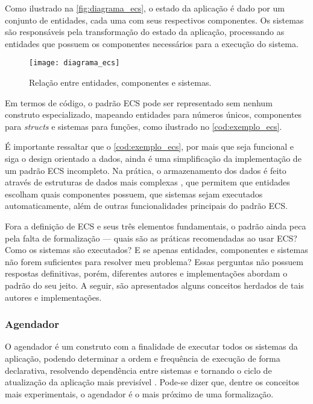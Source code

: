 Como ilustrado na \autoref{fig:diagrama_ecs}, o estado da aplicação é dado por um conjunto de entidades, cada uma com seus respectivos componentes. Os sistemas são responsáveis pela transformação do estado da aplicação, processando as entidades que possuem os componentes necessários para a execução do sistema.

\begin{figure}[H]
	\centering
	\texttt{[image: diagrama\_ecs]}
	\caption{Relação entre entidades, componentes e sistemas.}
	\label{fig:diagrama_ecs}
\end{figure}

Em termos de código, o padrão ECS pode ser representado sem nenhum construto especializado, mapeando entidades para números únicos, componentes para \textit{structs} e sistemas para funções, como ilustrado no \autoref{cod:exemplo_ecs}.

\codigoRust


É importante ressaltar que o \autoref{cod:exemplo_ecs}, por mais que seja funcional e siga o design orientado a dados, ainda é uma simplificação da implementação de um padrão ECS incompleto. Na prática, o armazenamento dos dados é feito através de estruturas de dados mais complexas \cite{ecsstorageinpics}, que permitem que entidades escolham quais componentes possuem, que sistemas sejam executados automaticamente, além de outras funcionalidades principais do padrão ECS.

Fora a definição de ECS e seus três elementos fundamentais, o padrão ainda peca pela falta de formalização — quais são as práticas recomendadas ao usar ECS? Como os sistemas são executados? E se apenas entidades, componentes e sistemas não forem suficientes para resolver meu problema? Essas perguntas não possuem respostas definitivas, porém, diferentes autores e implementações abordam o padrão do seu jeito. A seguir, são apresentados alguns conceitos herdados de tais autores e implementações.

\subsubsection{Agendador}

O agendador é um construto com a finalidade de executar todos os sistemas da aplicação, podendo determinar a ordem e frequência de execução de forma declarativa, resolvendo dependência entre sistemas e tornando o ciclo de atualização da aplicação mais previsível \cite{bevy}. Pode-se dizer que, dentre os conceitos mais experimentais, o agendador é o mais próximo de uma formalização.

